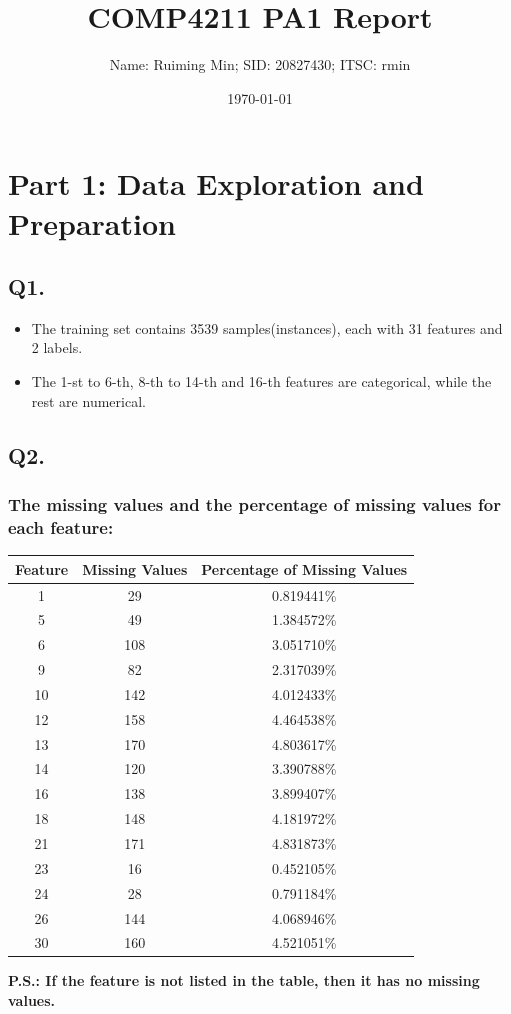 \documentclass{article}
\title{COMP4211 PA1 Report}
\author{Name: Ruiming Min; SID: 20827430; ITSC: rmin}
\date{\today}
\begin{document}
    
\maketitle

\section*{Part 1: Data Exploration and Preparation}

\subsection*{Q1.}
\begin{itemize}
    \item The training set contains 3539 samples(instances), each with 31 features and 2 labels.
    \item The 1-st to 6-th, 8-th to 14-th and 16-th features are categorical, while the rest are numerical.
\end{itemize}

\subsection*{Q2.}

\subsubsection*{The missing values and the percentage of missing values for each feature:}
\begin{center}
    \begin{tabular}{|c|c|c|}
        \hline
        Feature & Missing Values & Percentage of Missing Values \\
        \hline
        1 & 29 & 0.819441\% \\
        5 & 49 & 1.384572\% \\
        6 & 108 & 3.051710\% \\
        9 & 82 & 2.317039\% \\
        10 & 142 & 4.012433\% \\
        12 & 158 & 4.464538\% \\
        13 & 170 & 4.803617\% \\
        14 & 120 & 3.390788\% \\
        16 & 138 & 3.899407\% \\
        18 & 148 & 4.181972\% \\
        21 & 171 & 4.831873\% \\
        23 & 16 & 0.452105\% \\
        24 & 28 & 0.791184\% \\
        26 & 144 & 4.068946\% \\
        30 & 160 & 4.521051\% \\
        \hline
    \end{tabular}
    \newline
    \textbf{P.S.: If the feature is not listed in the table, then it has no missing values.}
\end{center}
\end{document}
